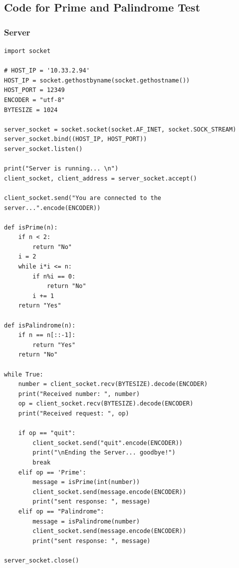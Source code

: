 \documentclass[11pt]{article}
\begin{document}
\subsection*{Code for Prime and Palindrome Test}
\subsubsection*{Server}
\begin{verbatim}
import socket

# HOST_IP = '10.33.2.94'
HOST_IP = socket.gethostbyname(socket.gethostname())
HOST_PORT = 12349
ENCODER = "utf-8"
BYTESIZE = 1024

server_socket = socket.socket(socket.AF_INET, socket.SOCK_STREAM)
server_socket.bind((HOST_IP, HOST_PORT))
server_socket.listen()

print("Server is running... \n")
client_socket, client_address = server_socket.accept()

client_socket.send("You are connected to the server...".encode(ENCODER))

def isPrime(n):
    if n < 2:
        return "No"
    i = 2
    while i*i <= n:
        if n%i == 0:
            return "No"
        i += 1
    return "Yes"

def isPalindrome(n):
    if n == n[::-1]:
        return "Yes"
    return "No"

while True:
    number = client_socket.recv(BYTESIZE).decode(ENCODER)
    print("Received number: ", number)
    op = client_socket.recv(BYTESIZE).decode(ENCODER)
    print("Received request: ", op)

    if op == "quit":
        client_socket.send("quit".encode(ENCODER))
        print("\nEnding the Server... goodbye!")
        break
    elif op == 'Prime':
        message = isPrime(int(number))
        client_socket.send(message.encode(ENCODER))
        print("sent response: ", message)
    elif op == "Palindrome":
        message = isPalindrome(number)
        client_socket.send(message.encode(ENCODER))
        print("sent response: ", message)

server_socket.close()
\end{verbatim}
\end{document}
